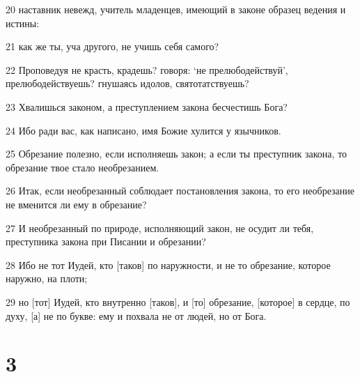 \par 20 наставник невежд, учитель младенцев, имеющий в законе образец ведения и истины:
\par 21 как же ты, уча другого, не учишь себя самого?
\par 22 Проповедуя не красть, крадешь? говоря: `не прелюбодействуй', прелюбодействуешь? гнушаясь идолов, святотатствуешь?
\par 23 Хвалишься законом, а преступлением закона бесчестишь Бога?
\par 24 Ибо ради вас, как написано, имя Божие хулится у язычников.
\par 25 Обрезание полезно, если исполняешь закон; а если ты преступник закона, то обрезание твое стало необрезанием.
\par 26 Итак, если необрезанный соблюдает постановления закона, то его необрезание не вменится ли ему в обрезание?
\par 27 И необрезанный по природе, исполняющий закон, не осудит ли тебя, преступника закона при Писании и обрезании?
\par 28 Ибо не тот Иудей, кто [таков] по наружности, и не то обрезание, которое наружно, на плоти;
\par 29 но [тот] Иудей, кто внутренно [таков], и [то] обрезание, [которое] в сердце, по духу, [а] не по букве: ему и похвала не от людей, но от Бога.

\chapter{3}

